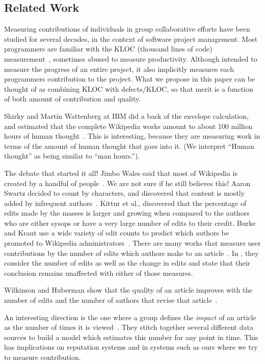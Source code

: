 \subsection{Related Work}

Measuring contributions of individuals in group collaborative
efforts have been studied for several decades, in the context of
software project management.
Most programmers are familiar with the KLOC (thousand lines of 
code) measurement~\cite{MITRE1988,Park1992},
sometimes abused to measure productivity.
Although intended to measure the progress of an
entire project, it also implicitly 
measures each programmers contribution to the project.
What we propose in this paper can be thought of as combining
KLOC with defects/KLOC, so that merit is a function of both
amount of contribution and quality.

Shirky and Martin Wattenberg at IBM did a back of the
envelope calculation, and estimated that the complete Wikipedia
works amount to about 100 million hours of human
thought~\cite{CognitiveSurplus2008}.
This is interesting, because they are measuring work
in terms of the amount of human thought that goes into it.
(We interpret ``Human thought'' as being similar 
to ``man hours.'').

The debate that started it all!
Jimbo Wales said that most of Wikipedia is created by
a handful of people~\cite{Wales2005}.
We are not sure if he still believes this!
Aaron Swartz decided to count by characters,
and discovered that content is mostly added
by infrequent authors~\cite{Swartz2006}.
Kittur et al., \cite{Kittur2007} discovered that the
percentage of edits made by the masses is larger and growing 
when compared to the authors who are either sysops or have a 
very large number of edits to their credit.
Burke and Kraut use a wide variety of edit counts to predict
which authors be promoted to Wikipedia 
administrators~\cite{AdministratorMop2008}.
There are many works that measure user contributions by the
number of edits which authors make to an 
article~\cite{Wales2005,EditsEqQuality2007,Kittur2007,
WikiDashboard2008,OrtegaBarahona2007,SteinHess2007}.
In \cite{Kittur2007}, they consider the number of edits
as well as the change in edits and state that their conclusion
remains unaffected with either of those measures.

Wilkinson and Huberman show that the quality of an article improves
with the number of edits and the number of authors that revise
that article~\cite{EditsEqQuality2007}.

An interesting direction is the one where a group defines the 
\textit{impact} of an article as the number of times it is 
viewed~\cite{WikiImpact2007}. 
They stitch together several different data sources to build a model 
which estimates this number for any point in time.
This has implications on reputation systems and in systems such as
ours where we try to measure contribution.

